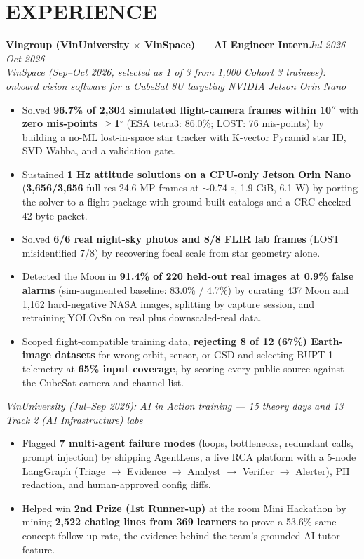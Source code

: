 \documentclass[10pt,a4paper]{article}
\newcommand{\role}[4]{%
  {\bfseries\color{ink}#1}\hfill{\itshape\color{muted}\small #2}\\[-0.6pt]
  {\itshape\small\color{ink}#3}\hfill{\small\color{muted}#4}\par\vspace{0.4pt}%
}
\begin{document}
\section{EXPERIENCE}
\role{Vingroup (VinUniversity $\times$ VinSpace) --- AI Engineer Intern}{Jul 2026 -- Oct 2026}
{VinSpace (Sep--Oct 2026, selected as 1 of 3 from 1{,}000 Cohort 3 trainees): onboard vision software for a CubeSat 8U targeting NVIDIA Jetson Orin Nano}{}
\begin{itemize}
  \item \small Solved \textbf{96.7\% of 2{,}304 simulated flight-camera frames within 10$''$} with \textbf{zero mis-points $\geq$1$^\circ$} (ESA tetra3: 86.0\%; LOST: 76 mis-points) by building a no-ML lost-in-space star tracker with K-vector Pyramid star ID, SVD Wahba, and a validation gate.
  \item \small Sustained \textbf{1 Hz attitude solutions on a CPU-only Jetson Orin Nano} (\textbf{3{,}656/3{,}656} full-res 24.6 MP frames at $\sim$0.74 s, 1.9 GiB, 6.1 W) by porting the solver to a flight package with ground-built catalogs and a CRC-checked 42-byte packet.
  \item \small Solved \textbf{6/6 real night-sky photos and 8/8 FLIR lab frames} (LOST misidentified 7/8) by recovering focal scale from star geometry alone.
  \item \small Detected the Moon in \textbf{91.4\% of 220 held-out real images at 0.9\% false alarms} (sim-augmented baseline: 83.0\% / 4.7\%) by curating 437 Moon and 1{,}162 hard-negative NASA images, splitting by capture session, and retraining YOLOv8n on real plus downscaled-real data.
  \item \small Scoped flight-compatible training data, \textbf{rejecting 8 of 12 (67\%) Earth-image datasets} for wrong orbit, sensor, or GSD and selecting BUPT-1 telemetry at \textbf{65\% input coverage}, by scoring every public source against the CubeSat camera and channel list.
\end{itemize}
{\itshape\small\color{ink}VinUniversity (Jul--Sep 2026): AI in Action training --- 15 theory days and 13 Track 2 (AI Infrastructure) labs}\par\vspace{0.4pt}
\begin{itemize}
  \item \small Flagged \textbf{7 multi-agent failure modes} (loops, bottlenecks, redundant calls, prompt injection) by shipping \href{https://agentlens.dpdns.org}{AgentLens}, a live RCA platform with a 5-node LangGraph (Triage $\rightarrow$ Evidence $\rightarrow$ Analyst $\rightarrow$ Verifier $\rightarrow$ Alerter), PII redaction, and human-approved config diffs.
  \item \small Helped win \textbf{2nd Prize (1st Runner-up)} at the room Mini Hackathon by mining \textbf{2{,}522 chatlog lines from 369 learners} to prove a 53.6\% same-concept follow-up rate, the evidence behind the team's grounded AI-tutor feature.
\end{itemize}
\end{document}
